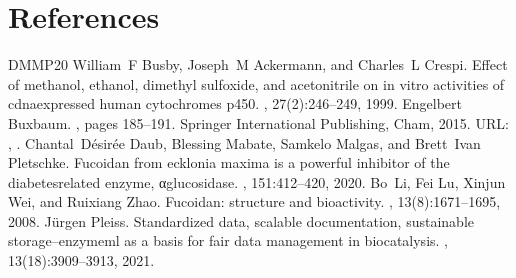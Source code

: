 \documentclass[letterpaper,10pt,english]{jupyterBook}
\begin{document}
\chapter{References}
\label{\detokenize{references:references}}\label{\detokenize{references::doc}}
\begin{sphinxthebibliography}{DMMP20}
\sphinxAtStartPar
William F Busby, Joseph M Ackermann, and Charles L Crespi. Effect of methanol, ethanol, dimethyl sulfoxide, and acetonitrile on in vitro activities of cdna\sphinxhyphen{}expressed human cytochromes p\sphinxhyphen{}450. , 27(2):246–249, 1999.
\sphinxAtStartPar
Engelbert Buxbaum. , pages 185–191. Springer International Publishing, Cham, 2015. URL: , .
\sphinxAtStartPar
Chantal Désirée Daub, Blessing Mabate, Samkelo Malgas, and Brett Ivan Pletschke. Fucoidan from ecklonia maxima is a powerful inhibitor of the diabetes\sphinxhyphen{}related enzyme, α\sphinxhyphen{}glucosidase. , 151:412–420, 2020.
\sphinxAtStartPar
Bo Li, Fei Lu, Xinjun Wei, and Ruixiang Zhao. Fucoidan: structure and bioactivity. , 13(8):1671–1695, 2008.
\sphinxAtStartPar
Jürgen Pleiss. Standardized data, scalable documentation, sustainable storage–enzymeml as a basis for fair data management in biocatalysis. , 13(18):3909–3913, 2021.
\end{sphinxthebibliography}







\renewcommand{\indexname}{Index}
\printindex
\end{document}
